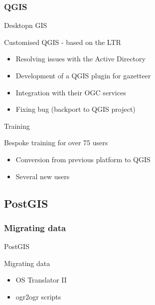 \subsubsection{QGIS}
\begin{frame}{Desktopn GIS}
	\begin{block}{Customised QGIS - based on the LTR}
		\begin{itemize}
			\item Resolving issues with the Active Directory
			\item Development of a QGIS plugin for gazetteer
			\item Integration with their OGC services
			\item Fixing bug (backport to QGIS project)
		\end{itemize}
	\end{block}
\end{frame}

\begin{frame}{Training}
	\begin{block}{Bespoke training for over 75 users}
		\begin{itemize}
			\item Conversion from previous platform to QGIS
			\item Several new users
		\end{itemize}
	\end{block}
\end{frame}

\subsection{PostGIS}

\subsubsection{Migrating data}

\begin{frame}{PostGIS}
	\begin{block}{Migrating data}
		\begin{itemize}
			\item OS Translator II
			\item ogr2ogr scripts
		\end{itemize}
	\end{block}	
\end{frame}

